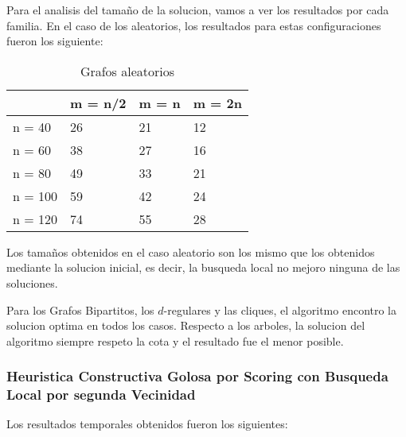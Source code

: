 \newpage

Para el analisis del tamaño de la solucion, vamos a ver los resultados por cada familia. En el caso de los aleatorios, los resultados para estas configuraciones fueron los siguiente:

\begin{table}[H]
\centering
\caption{Grafos aleatorios}
\label{my-label}
\begin{tabular}{|l|lll|}
\hline
        & \multicolumn{1}{l|}{m = n/2} & \multicolumn{1}{l|}{m = n} & m = 2n \\ \hline
n = 40  & 26                           & 21                         & 12     \\ \cline{1-1}
n = 60  & 38                           & 27                         & 16     \\ \cline{1-1}
n = 80  & 49                           & 33                         & 21     \\ \cline{1-1}
n = 100 & 59                           & 42                         & 24     \\ \cline{1-1}
n = 120 & 74                           & 55                         & 28     \\ \hline
\end{tabular}
\end{table}

Los tamaños obtenidos en el caso aleatorio son los mismo que los obtenidos mediante la solucion inicial, es decir, la busqueda local no mejoro ninguna de las soluciones.

Para los Grafos Bipartitos, los $d$-regulares y las cliques, el algoritmo encontro la solucion optima en todos los casos. Respecto a los arboles, la solucion del algoritmo siempre respeto la cota y el resultado fue el menor posible.

\newpage
\subsubsection{Heuristica Constructiva Golosa por Scoring con Busqueda Local por segunda Vecinidad}

Los resultados temporales obtenidos fueron los siguientes:

